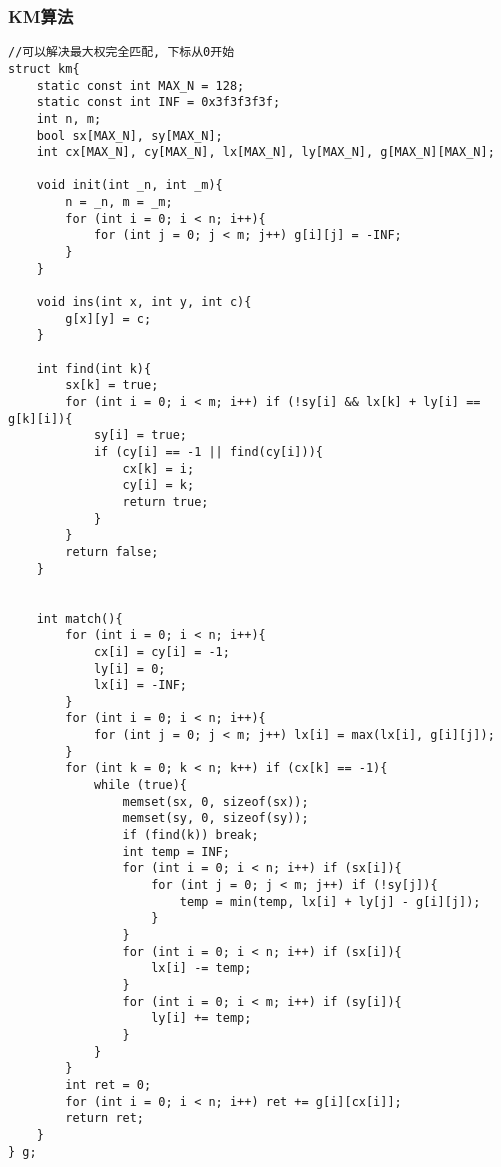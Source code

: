 \subsubsection{KM算法}
\begin{verbatim}
//可以解决最大权完全匹配, 下标从0开始
struct km{
    static const int MAX_N = 128;
    static const int INF = 0x3f3f3f3f;
    int n, m;
    bool sx[MAX_N], sy[MAX_N];
    int cx[MAX_N], cy[MAX_N], lx[MAX_N], ly[MAX_N], g[MAX_N][MAX_N];

    void init(int _n, int _m){
        n = _n, m = _m;
        for (int i = 0; i < n; i++){
            for (int j = 0; j < m; j++) g[i][j] = -INF;
        }
    }

    void ins(int x, int y, int c){
        g[x][y] = c;
    }

    int find(int k){
        sx[k] = true;
        for (int i = 0; i < m; i++) if (!sy[i] && lx[k] + ly[i] == g[k][i]){
            sy[i] = true;
            if (cy[i] == -1 || find(cy[i])){
                cx[k] = i;
                cy[i] = k;
                return true;
            }
        }
        return false;
    }


    int match(){
        for (int i = 0; i < n; i++){
            cx[i] = cy[i] = -1;
            ly[i] = 0;
            lx[i] = -INF;
        }
        for (int i = 0; i < n; i++){
            for (int j = 0; j < m; j++) lx[i] = max(lx[i], g[i][j]);
        }
        for (int k = 0; k < n; k++) if (cx[k] == -1){
            while (true){
                memset(sx, 0, sizeof(sx));
                memset(sy, 0, sizeof(sy));
                if (find(k)) break;
                int temp = INF;
                for (int i = 0; i < n; i++) if (sx[i]){
                    for (int j = 0; j < m; j++) if (!sy[j]){
                        temp = min(temp, lx[i] + ly[j] - g[i][j]);
                    }
                }
                for (int i = 0; i < n; i++) if (sx[i]){
                    lx[i] -= temp;
                }
                for (int i = 0; i < m; i++) if (sy[i]){
                    ly[i] += temp;
                }
            }
        }
        int ret = 0;
        for (int i = 0; i < n; i++) ret += g[i][cx[i]];
        return ret;
    }
} g; 
\end{verbatim}
